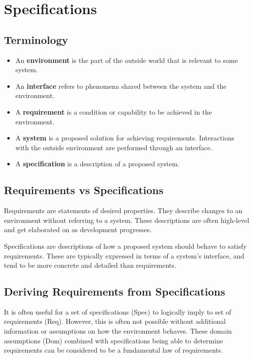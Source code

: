 \documentclass[12pt,titlepage]{article}
\begin{document}
  \newpage

  \section{Specifications}

    \subsection{Terminology}
      \begin{itemize}
        \item An \textbf{environment} is the part of the outside world that is relevant to some system.
        \item An \textbf{interface} refers to phenomena shared between the system and the environment.
        \item A \textbf{requirement} is a condition or capability to be achieved in the environment.
        \item A \textbf{system} is a proposed solution for achieving requirements. Interactions with the outside environment are performed
          through an interface.
        \item A \textbf{specification} is a description of a proposed system.
      \end{itemize}

    \subsection{Requirements vs Specifications}
      Requirements are statements of desired properties. They describe changes to an environment without referring to a system. These descriptions are often
      high-level and get elaborated on as development progresses.

      Specifications are descriptions of how a proposed system should behave to satisfy requirements. These are typically expressed in terms of a system's
      interface, and tend to be more concrete and detailed than requirements.

    \subsection{Deriving Requirements from Specifications}
      It is often useful for a set of specifications (Spec) to logically imply to set of requirements (Req). However, this is often not possible without additional
      information or assumptions on how the environment behaves. These domain assumptions (Dom) combined with specifications being able to determine requirements
      can be considered to be a fundamental law of requirements.
\end{document}
